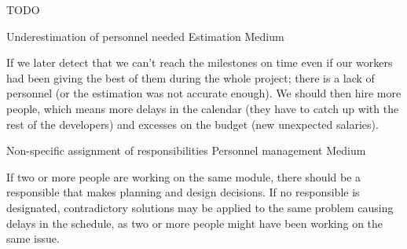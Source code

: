 TODO
\begin{risk}[riskPersonnelUnderestimation]{Underestimation of personnel needed}
\riskcat Estimation
 Medium

If we later detect that we can't reach the milestones on time even if our workers had been giving the best of them during the whole project; there is a lack of personnel (or the estimation was not accurate enough). We should then hire more people, which means more delays in the calendar (they have to catch up with the rest of the developers) and excesses on the budget (new unexpected salaries).
\end{risk}

\begin{risk}[riskResponsibilitesAssignment]{Non-specific assignment of responsibilities}
\riskcat Personnel management
 Medium

If two or more people are working on the same module, there should be a responsible that makes planning and design decisions. If no responsible is designated, contradictory solutions may be applied to the same problem causing delays in the schedule, as two or more people might have been working on the same issue.
\end{risk}
